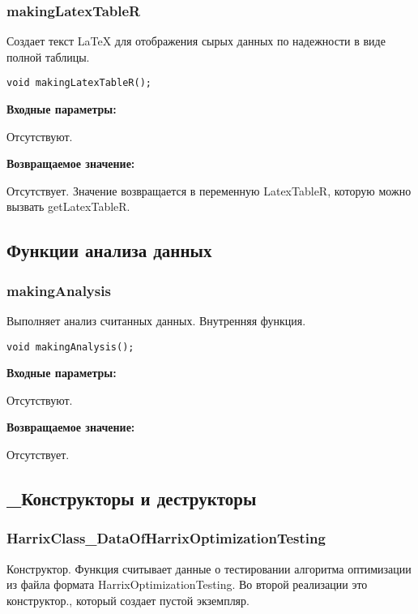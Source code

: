 \subsubsection{makingLatexTableR}\label{makingLatexTableR}

Создает текст LaTeX для отображения сырых данных по надежности в виде полной таблицы.


\begin{lstlisting}[label=code_syntax_makingLatexTableR,caption=Синтаксис]
void makingLatexTableR();
\end{lstlisting}

\textbf{Входные параметры:}

Отсутствуют.

\textbf{Возвращаемое значение:}

Отсутствует. Значение возвращается в переменную LatexTableR, которую можно вызвать getLatexTableR.


\subsection{Функции анализа данных}

\subsubsection{makingAnalysis}\label{makingAnalysis}

Выполняет анализ считанных данных. Внутренняя функция.


\begin{lstlisting}[label=code_syntax_makingAnalysis,caption=Синтаксис]
void makingAnalysis();
\end{lstlisting}

\textbf{Входные параметры:}

Отсутствуют.

\textbf{Возвращаемое значение:}

Отсутствует.


\subsection{\_Конструкторы и деструкторы}

\subsubsection{HarrixClass\_DataOfHarrixOptimizationTesting}\label{HarrixClass_DataOfHarrixOptimizationTesting}

Конструктор. Функция считывает данные о тестировании алгоритма оптимизации из файла формата HarrixOptimizationTesting. Во второй реализации это конструктор., который создает пустой экземпляр.


